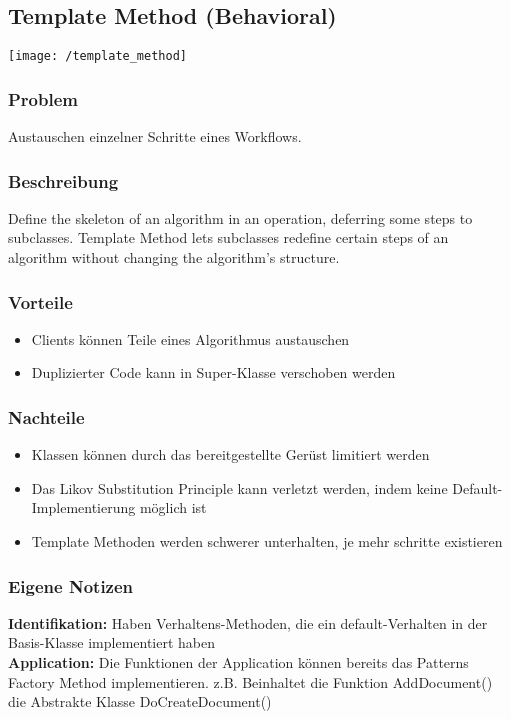\subsection{Template Method (Behavioral)}
\texttt{[image: /template\_method]}
\subsubsection{Problem}
Austauschen einzelner Schritte eines Workflows.
\subsubsection{Beschreibung}
Define the skeleton of an algorithm in an operation, deferring some steps to subclasses. Template Method lets subclasses redefine certain steps of an algorithm without changing the algorithm's structure.
\subsubsection{Vorteile}
\begin{itemize}[topsep=0pt]
    \itemsep -0.4em
    \item Clients können Teile eines Algorithmus austauschen
    \item Duplizierter Code kann in Super-Klasse verschoben werden
\end{itemize}
\subsubsection{Nachteile}
\begin{itemize}[topsep=0pt]
    \itemsep -0.4em
    \item Klassen können durch das bereitgestellte Gerüst limitiert werden
    \item Das Likov Substitution Principle kann verletzt werden, indem keine Default-Implementierung möglich ist
    \item Template Methoden werden schwerer unterhalten, je mehr schritte existieren
\end{itemize}
\subsubsection{Eigene Notizen}
\textbf{Identifikation:} Haben Verhaltens-Methoden, die ein \dq default\dq-Verhalten in der Basis-Klasse implementiert haben\\
\textbf{Application:} Die Funktionen der Application können bereits das Patterns Factory Method implementieren. z.B. Beinhaltet die Funktion AddDocument() die Abstrakte Klasse DoCreateDocument()

